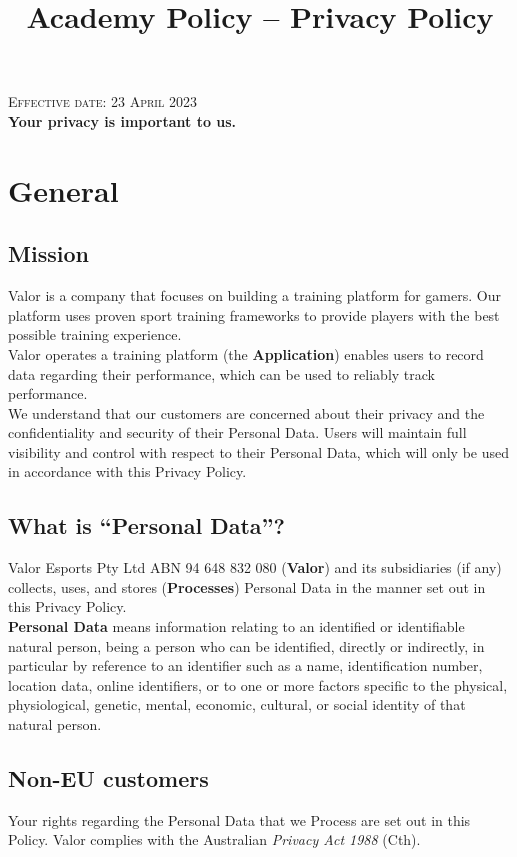 \documentclass[10pt]{article}
\begin{document}
\title{Academy Policy -- Privacy Policy}

\textsc{Effective date: 23 April 2023} \\

\textbf{Your privacy is important to us.}


\section{General}
\label{general}
\subsection{Mission}
Valor is a company that focuses on building a training platform for gamers. Our platform uses proven sport training frameworks to provide players with the best possible training experience. \\

Valor operates a training platform (the \textbf{Application}) enables users to record data regarding their performance, which can be used to reliably track performance. \\

We understand that our customers are concerned about their privacy and the confidentiality and security of their Personal Data. Users will maintain full visibility and control with respect to their Personal Data, which will only be used in accordance with this Privacy Policy.

\subsection{What is ``Personal Data''?}
Valor Esports Pty Ltd ABN 94 648 832 080 (\textbf{Valor}) and its subsidiaries (if any) collects, uses, and stores (\textbf{Processes}) Personal Data in the manner set out in this Privacy Policy. \\

\textbf{Personal Data} means information relating to an identified or identifiable natural person, being a person who can be identified, directly or indirectly, in particular by reference to an identifier such as a name, identification number, location data, online identifiers, or to one or more factors specific to the physical, physiological, genetic, mental, economic, cultural, or social identity of that natural person.

\subsection{Non-EU customers}
\label{general_nonEU}
Your rights regarding the Personal Data that we Process are set out in this Policy. Valor complies with the Australian \textit{Privacy Act 1988} (Cth). \\
\end{document}
